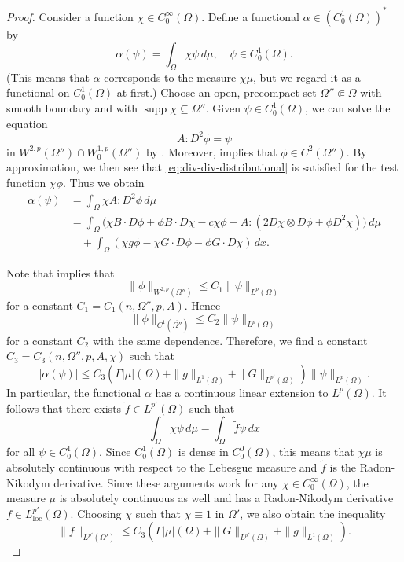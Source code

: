 \documentclass[a4paper]{article}
\newcommand{\loc}{\mathrm{loc}}
\DeclareMathOperator{\supp}{supp}
\theoremstyle{remark}
\begin{document}
\begin{proof}
Consider a function $\chi \in C_0^\infty(\Omega)$. Define a functional
$\alpha \in (C_0^1(\Omega))^*$ by
\[
\alpha(\psi) = \int_\Omega \chi \psi \, d\mu, \quad \psi \in C_0^1(\Omega).
\]
(This means that $\alpha$ corresponds to the measure $\chi \mu$, but we regard it as a functional
on $C_0^1(\Omega)$ at first.)
Choose an open, precompact set $\Omega'' \Subset \Omega$ with smooth boundary and with $\supp \chi \subseteq \Omega''$.
Given $\psi \in C_0^1(\Omega)$, we can solve the equation
\[
A: D^2 \phi = \psi
\]
in $W^{2, p}(\Omega'') \cap W_0^{1, p}(\Omega'')$ by \cite[Theorem 9.15]{Gilbarg-Trudinger:83}. Moreover,
\cite[Theorem 9.19]{Gilbarg-Trudinger:83} implies that
$\phi \in C^2(\Omega'')$. By approximation, we then see that \eqref{eq:div-div-distributional}
is satisfied for the test function $\chi \phi$. Thus we obtain
\[
\begin{split}
\alpha(\psi) & = \int_\Omega \chi A: D^2\phi \, d\mu \\
& = \int_\Omega \bigl(\chi B \cdot D\phi + \phi B \cdot D\chi - c \chi\phi - A : (2D\chi \otimes D\phi + \phi D^2 \chi)\bigr) \, d\mu \\
& \quad + \int_\Omega (\chi g\phi - \chi G \cdot D\phi - \phi G \cdot D\chi) \, dx.
\end{split}
\]

Note that \cite[Lemma 9.17]{Gilbarg-Trudinger:83} implies that
\[
\|\phi\|_{W^{2, p}(\Omega'')} \le C_1 \|\psi\|_{L^p(\Omega)}
\]
for a constant $C_1 = C_1(n, \Omega'', p, A)$. Hence
\[
\|\phi\|_{C^1(\overline{\Omega''})} \le C_2 \|\psi\|_{L^p(\Omega)}
\]
for a constant $C_2$ with the same dependence.
Therefore, we find a constant $C_3 = C_3(n, \Omega'', p, A, \chi)$ such that
\[
|\alpha(\psi)| \le C_3 \left(\Gamma |\mu|(\Omega) + \|g\|_{L^1(\Omega)} + \|G\|_{L^{p'}(\Omega)}\right) \|\psi\|_{L^p(\Omega)}.
\]
In particular, the functional $\alpha$ has a continuous linear extension to $L^p(\Omega)$.
It follows that there exists $\tilde{f} \in L^{p'}(\Omega)$ such that
\[
\int_\Omega \chi \psi \, d\mu = \int_\Omega \tilde{f} \psi \, dx
\]
for all $\psi \in C_0^1(\Omega)$. Since $C_0^1(\Omega)$ is dense in $C_0^0(\Omega)$, this means that $\chi \mu$ is absolutely continuous with respect
to the Lebesgue measure and $\tilde{f}$ is the Radon-Nikodym derivative. Since
these arguments work for any $\chi \in C_0^\infty(\Omega)$,
the measure $\mu$ is absolutely continuous as well and has a
Radon-Nikodym derivative $f \in L_\loc^{p'}(\Omega)$.
Choosing $\chi$ such that $\chi \equiv 1$ in $\Omega'$, we also obtain the inequality
\begin{equation} \label{eq:L^p-estimate1}
\|f\|_{L^{p'}(\Omega')} \le C_3 \left(\Gamma |\mu|(\Omega) + \|G\|_{L^{p'}(\Omega)} + \|g\|_{L^1(\Omega)}\right).
\end{equation}


\end{proof}
\end{document}
